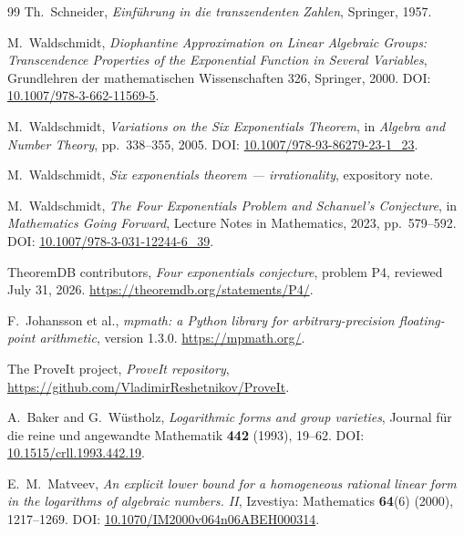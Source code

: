 \documentclass[11pt,oneside]{article}
\theoremstyle{definition}
\theoremstyle{remark}
\begin{document}
\begin{thebibliography}{99}
Th.~Schneider,
\newblock \emph{Einf\"uhrung in die transzendenten Zahlen},
\newblock Springer, 1957.

M.~Waldschmidt,
\newblock \emph{Diophantine Approximation on Linear Algebraic Groups: Transcendence
Properties of the Exponential Function in Several Variables},
\newblock Grundlehren der mathematischen Wissenschaften 326, Springer, 2000.
\newblock DOI: \href{https://doi.org/10.1007/978-3-662-11569-5}{10.1007/978-3-662-11569-5}.

M.~Waldschmidt,
\newblock \emph{Variations on the Six Exponentials Theorem},
\newblock in \emph{Algebra and Number Theory}, pp.~338--355, 2005.
\newblock DOI:
\href{https://doi.org/10.1007/978-93-86279-23-1_23}{10.1007/978-93-86279-23-1\_23}.

M.~Waldschmidt,
\newblock \emph{Six exponentials theorem --- irrationality},
\newblock expository note.

M.~Waldschmidt,
\newblock \emph{The Four Exponentials Problem and Schanuel's Conjecture},
\newblock in \emph{Mathematics Going Forward}, Lecture Notes in Mathematics, 2023,
pp.~579--592.
\newblock DOI:
\href{https://doi.org/10.1007/978-3-031-12244-6_39}{10.1007/978-3-031-12244-6\_39}.

TheoremDB contributors,
\newblock \emph{Four exponentials conjecture}, problem P4, reviewed July 31, 2026.
\newblock \url{https://theoremdb.org/statements/P4/}.

F.~Johansson et al.,
\newblock \emph{mpmath: a Python library for arbitrary-precision floating-point arithmetic},
\newblock version 1.3.0.
\newblock \url{https://mpmath.org/}.

The ProveIt project,
\newblock \emph{ProveIt repository},
\newblock \url{https://github.com/VladimirReshetnikov/ProveIt}.

A.~Baker and G.~W\"ustholz,
\newblock \emph{Logarithmic forms and group varieties},
\newblock Journal f\"ur die reine und angewandte Mathematik \textbf{442} (1993), 19--62.
\newblock DOI: \href{https://doi.org/10.1515/crll.1993.442.19}{10.1515/crll.1993.442.19}.

E.~M.~Matveev,
\newblock \emph{An explicit lower bound for a homogeneous rational linear form in the logarithms of algebraic numbers. II},
\newblock Izvestiya: Mathematics \textbf{64}(6) (2000), 1217--1269.
\newblock DOI: \href{https://doi.org/10.1070/IM2000v064n06ABEH000314}{10.1070/IM2000v064n06ABEH000314}.


\end{thebibliography}
\end{document}
